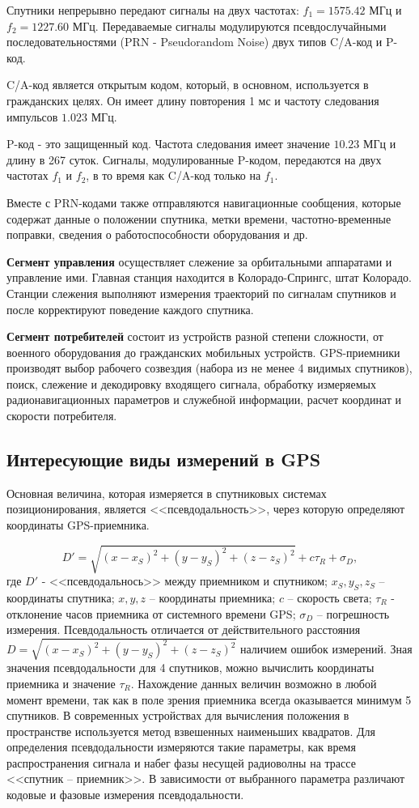 \documentclass[a4paper]{article}
\begin{document}
Спутники непрерывно передают сигналы на двух частотах: $f_1 = 1575.42 \text{ МГц}$ и $f_2 = 1227.60 \text{ МГц}$. Передаваемые сигналы модулируются псевдослучайными последовательностями (PRN - Pseudorandom Noise) двух типов C/A-код и P-код.

C/A-код является открытым кодом, который, в основном, используется в гражданских целях. Он имеет длину повторения 1 мс и частоту следования импульсов $1.023 \text{ МГц}$.

P-код - это защищенный код. Частота следования имеет значение $10.23 \text{ МГц}$ и длину в 267 суток. Сигналы, модулированные P-кодом, передаются на двух частотах $f_1$ и $f_2$, в то время как C/A-код только на $f_1$.

Вместе с PRN-кодами также отправляются навигационные сообщения, которые содержат данные о положении спутника, метки времени, частотно-временные поправки, сведения о работоспособности оборудования и др.

\textbf{Сегмент управления} осуществляет слежение за орбитальными аппаратами и управление ими. Главная станция находится в Колорадо-Спрингс, штат Колорадо. Станции слежения выполняют измерения траекторий по сигналам спутников и после корректируют поведение каждого спутника.

\textbf{Сегмент потребителей} состоит из устройств разной степени сложности, от военного оборудования до гражданских мобильных устройств. GPS-приемники производят выбор рабочего созвездия (набора из не менее 4 видимых спутников), поиск, слежение и декодировку входящего сигнала, обработку измеряемых радионавигационных параметров и служебной информации, расчет координат и скорости потребителя.

\subsection{Интересующие виды измерений в GPS}
Основная величина, которая измеряется в спутниковых системах позиционирования, является <<псевдодальность>>, через которую определяют координаты GPS-приемника.

\begin{equation}
D' = \sqrt{(x - x_S)^2 + (y - y_S)^2 + (z - z_S)^2} + c\tau_R +\sigma_D,
\end{equation}
где $D'$ - <<псевдодальнось>> между приемником и спутником; $x_S, y_S, z_S$ -- координаты спутника; $x, y, z$ -- координаты приемника; $c$ -- скорость света; $\tau_R$ - отклонение часов приемника от системного времени GPS; $\sigma_D$ -- погрешность измерения. 
Псевдодальность отличается от действительного расстояния $D = \sqrt{(x - x_S) ^ 2 + (y - y_S) ^ 2 + (z - z_S) ^ 2}$ наличием ошибок измерений. 
Зная значения псевдодальности для 4 спутников, можно вычислить координаты приемника и значение $\tau_R$. Нахождение данных величин возможно в любой момент времени, так как в поле зрения приемника всегда оказывается минимум 5 спутников. В современных устройствах для вычисления положения в пространстве используется метод взвешенных наименьших квадратов. Для определения псевдодальности измеряются такие параметры, как время распространения сигнала и набег фазы несущей радиоволны на трассе <<спутник -- приемник>>. В зависимости от выбранного параметра различают кодовые и фазовые измерения псевдодальности.
\end{document}

